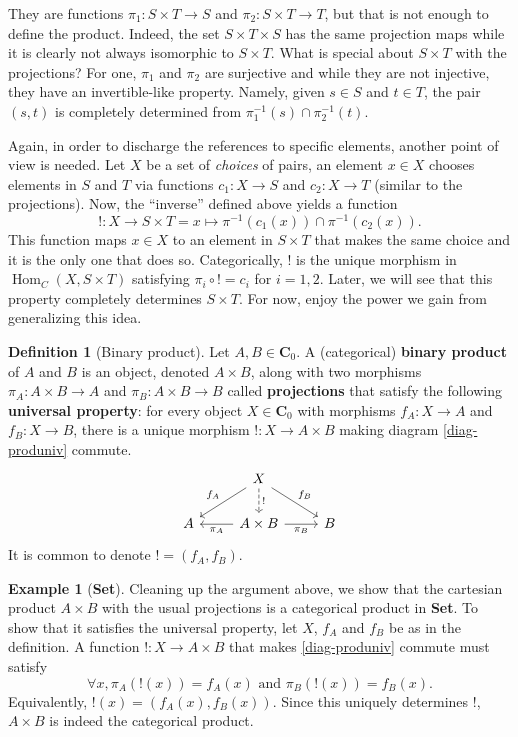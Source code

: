\documentclass{article}
\theoremstyle{definition}
\newtheorem{defn}[thm]{Definition}
\newtheorem{exmp}[thm]{Example}
\theoremstyle{remark}
\DeclareMathOperator{\Hom}{Hom}
\begin{document}
They are functions $\pi_1: S\times T \rightarrow S$ and $\pi_2: S\times T \rightarrow T$, but that is not enough to define the product. Indeed, the set $S\times T \times S$ has the same projection maps while it is clearly not always isomorphic to $S\times T$. What is special about $S\times T$ with the projections? For one, $\pi_1$ and $\pi_2$ are surjective and while they are not injective, they have an invertible-like property. Namely, given $s \in S$ and $t \in T$, the pair $(s, t)$ is completely determined from $\pi_1^{-1}(s) \cap \pi_2^{-1}(t)$.

Again, in order to discharge the references to specific elements, another point of view is needed. Let $X$ be a set of \textit{choices} of pairs, an element $x \in X$ chooses elements in $S$ and $T$ via functions $c_1 : X \rightarrow S$ and $c_2: X \rightarrow T$ (similar to the projections). Now, the ``inverse'' defined above yields a function 
\[!:X \rightarrow S\times T = x \mapsto \pi^{-1}(c_1(x)) \cap \pi^{-1}(c_2(x)).\]
This function maps $x \in X$ to an element in $S\times T$ that makes the same choice and it is the only one that does so. Categorically, $!$ is the unique morphism in $\Hom_C(X, S\times T)$ satisfying $\pi_i\circ ! = c_i$ for $i =1,2$. Later, we will see that this property completely determines $S\times T$. For now, enjoy the power we gain from generalizing this idea.
\begin{defn}[Binary product]
    Let $A, B \in \mathbf{C}_0$. A (categorical) \textbf{binary product} of $A$ and $B$ is an object, denoted $A \times B$, along with two morphisms $\pi_A: A \times B \rightarrow A$ and $\pi_B: A \times B \rightarrow B$ called \textbf{projections} that satisfy the following \textbf{universal property}: for every object $X \in \mathbf{C}_0$ with morphisms $f_A: X\rightarrow A$ and $f_B:X \rightarrow B$, there is a unique morphism $!: X \rightarrow A \times B$ making diagram \eqref{diag-produniv} commute.
    \begin{equation}
    \begin{tikzcd}\label{diag-produniv}
        & X \arrow[ld, "f_A"'] \arrow[rd, "f_B"] \arrow[d, "!", dashed] &   \\
        A & A\times B \arrow[l, "\pi_A"] \arrow[r, "\pi_B"']              & B
    \end{tikzcd}
    \end{equation}
    It is common to denote $! = (f_A, f_B)$.
\end{defn}
\begin{exmp}[\textbf{Set}]
    Cleaning up the argument above, we show that the cartesian product $A \times B$ with the usual projections is a categorical product in \textbf{Set}. To show that it satisfies the universal property, let $X$, $f_A$ and $f_B$ be as in the definition. A function $!:X\rightarrow A \times B$ that makes \eqref{diag-produniv} commute must satisfy
    \[\forall x, \pi_A(!(x)) = f_A(x) \text{ and } \pi_B(!(x)) = f_B(x).\]
    Equivalently, $!(x) = (f_A(x), f_B(x))$. Since this uniquely determines $!$, $A \times B$ is indeed the categorical product.
\end{exmp}
\end{document}
